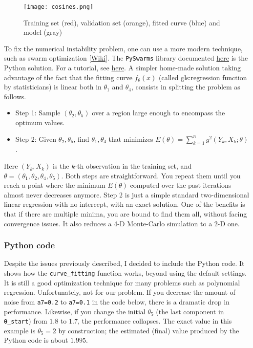 \documentclass[oneside,10pt]{book}
\begin{document}
\begin{figure}[H]
\centering
\texttt{[image: cosines.png]}  
\caption{Training set (red), validation set (orange), fitted curve (blue) and model (gray)}
\label{fig:pyplot1}
\end{figure}

To fix the numerical instability problem, one can use a more modern technique, such as \textcolor{index}{swarm optimization} [\href{https://en.wikipedia.org/wiki/Particle_swarm_optimization}{Wiki}]. The \texttt{PySwarms} library documented \href{https://pyswarms.readthedocs.io/en/latest/}{here} 
 is the Python solution. For a tutorial, see 
 \href{https://machinelearningmastery.com/a-gentle-introduction-to-particle-swarm-optimization/}{here}. A simpler home-made solution taking 
advantage of the fact that the fitting curve $f_\theta(x)$ (called \gls{gls:regression} function by statisticians) is linear both in $\theta_1$ and
 $\theta_4$,  consists in splitting the problem as follows.

\begin{itemize}
\item Step 1: Sample $(\theta_2,\theta_5)$ over a region large enough to encompass the optimum values.
\item Step 2:  Given $\theta_2,\theta_5$, find $\theta_1,\theta_4$ that minimizes $E(\theta)=\sum_{k=1}^n g^2(Y_k,X_k;\theta)$. 
\end{itemize}
Here $(Y_k,X_k)$ is the $k$-th observation in the training set, and $\theta=(\theta_1,\theta_2, \theta_4,\theta_5)$. Both steps are straightforward.  
You repeat them until you reach a point where the minimum $E(\theta)$ computed over the past iterations almost never decreases anymore. Step 2 is just a simple standard two-dimensional linear regression with no intercept, with an exact solution. One of the benefits is that if there are
 multiple minima, you are bound to find them all, without facing convergence issues. It also reduces a 4-D Monte-Carlo simulation to a 2-D one.



\subsubsection{Python code}\label{poihgf}

Despite the issues previously described, I decided to include the Python code. It shows how the \texttt{curve\_fitting} function works, beyond using the default settings.
 It is still a good optimization technique for many problems such as polynomial regression. Unfortunately, not for our problem. If you decrease
 the amount of noise from \texttt{a7=0.2} to \texttt{a7=0.1} in the code below, there is a dramatic drop in performance. Likewise, if you change the  initial $\theta_5$ (the last component in  \texttt{\textcolor{gray2}{θ}\_start}) 
  from 
$1.8$ to $1.7$, the performance collapses. The exact value in this example is $\theta_5=2$ by construction; the estimated
 (final) value produced by the Python code is about $1.995$. 
\end{document}
